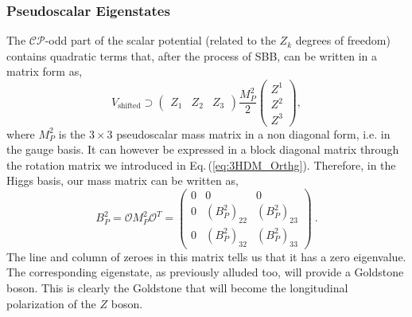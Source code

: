 \documentclass[10pt]{report}
\begin{document}
\subsubsection{Pseudoscalar Eigenstates}

The $\mathcal{CP}$-odd part of the scalar potential (related to the $Z_k$ degrees of freedom) contains quadratic terms that, after the process of SBB, can be written in a matrix form as,   
%
\begin{equation}
V_{\text{shifted}} \supset \left( \begin{array}{ccc} Z_1 & Z_2 & Z_3 \end{array} \right) \frac{M_P^2}{2} \left( \begin{array}{c} Z^1 \\ Z^2 \\ Z^3 \end{array} \right)  , 
\end{equation} 
%
where $M_P^2$ is the $3\times3$ pseudoscalar mass matrix in a non diagonal form, i.e. in the gauge basis. 
%
It can however be expressed in a block diagonal matrix through the rotation matrix we introduced in Eq.\,(\ref{eq:3HDM_Orthg}). Therefore, in the Higgs basis, our mass matrix can be written as, 
%
\begin{equation}
B^2_P = \mathcal{O} M_P^2 \mathcal{O}^T = \left( \begin{array}{ccc}
0 & 0 & 0 \\ 
0 & \left( B^2_P \right)_{22} &  \left( B^2_P \right)_{23} \\
0 & \left( B^2_P \right)_{32} &  \left( B^2_P \right)_{33}
\end{array} \right) \ .
\end{equation}
%
The line and column of zeroes in this matrix tells us that it has a zero eigenvalue. 
%
The corresponding eigenstate, as previously alluded too, will provide a Goldstone boson. 
%
This is clearly the Goldstone that will become the longitudinal polarization of the $Z$ boson.  
\end{document}
